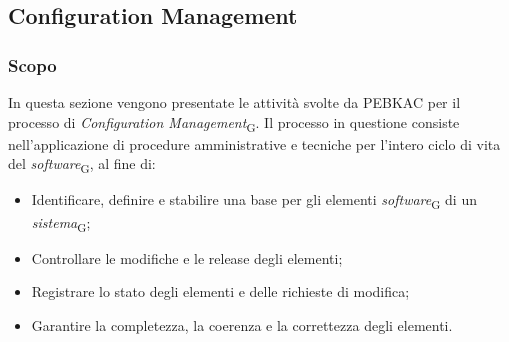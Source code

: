 \subsection{Configuration Management}
\subsubsection{Scopo}
In questa sezione vengono presentate le attività svolte da PEBKAC per il processo di \textit{Configuration Management}\textsubscript{G}. Il processo in questione consiste nell'applicazione di procedure amministrative e tecniche per l'intero ciclo di vita del \textit{software}\textsubscript{G}, al fine di:
\begin{itemize}
    \item Identificare, definire e stabilire una base per gli elementi \textit{software}\textsubscript{G} di un \textit{sistema}\textsubscript{G};
    \item Controllare le modifiche e le release degli elementi;
    \item Registrare lo stato degli elementi e delle richieste di modifica;
    \item Garantire la completezza, la coerenza e la correttezza degli elementi.
\end{itemize}
